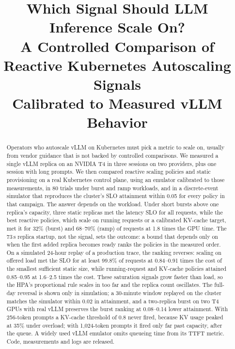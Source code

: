 \documentclass[10pt,conference]{IEEEtran}
\title{Which Signal Should LLM Inference Scale On?\\
A Controlled Comparison of Reactive Kubernetes Autoscaling Signals\\
Calibrated to Measured vLLM Behavior}
\author{\IEEEauthorblockN{Ruthvik Garlapati}\IEEEauthorblockA{Independent}}
\begin{document}
\maketitle

\begin{abstract}
Operators who autoscale vLLM on Kubernetes must pick a metric to scale on,
usually from vendor guidance that is not backed by controlled comparisons. We
measured a single vLLM replica on an NVIDIA T4 in three sessions on two
providers, plus one session with long prompts. We then compared reactive scaling policies and static provisioning
on a real Kubernetes control plane, using an emulator calibrated to those
measurements, in 80 trials under burst and ramp workloads, and in a
discrete-event simulator that reproduces the cluster's SLO attainment within
0.05 for every policy in that campaign. The answer depends on the workload. Under short bursts
above one replica's capacity, three static replicas met the latency SLO for
all requests, while the best reactive policies, which scale on running
requests or a calibrated KV-cache target, met it for 32\% (burst) and 68--70\%
(ramp) of requests at 1.8 times the GPU time. The 73\,s replica startup, not
the signal, sets the outcome: a bound that depends only on when the first
added replica becomes ready ranks the policies in the measured order. On a simulated 24-hour replay of a production
trace, the ranking reverses: scaling on offered load met the SLO for at least
99.8\% of requests at 0.84--0.91 times the cost of the smallest sufficient
static size, while running-request and KV-cache policies attained 0.85--0.95
at 1.6--2.5 times the cost. These saturation signals grow faster than load,
so the HPA's proportional rule scales in too far and the replica count
oscillates. The full-day reversal is shown only in simulation; a 30-minute
window replayed on the cluster matches the simulator within 0.02 in
attainment, and a two-replica burst on two T4 GPUs with real vLLM preserves
the burst ranking at 0.08--0.14 lower attainment. With 256-token prompts a
KV-cache threshold of 0.8 never fired, because KV usage peaked at 35\% under
overload; with 1{,}024-token prompts it fired only far past capacity, after
the queue. A widely used vLLM emulator omits queueing time from its TTFT
metric. Code, measurements and logs are released.
\end{abstract}
\end{document}
